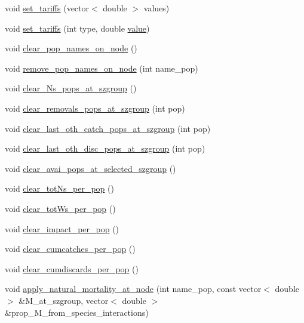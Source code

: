 \begin{DoxyCompactItemize}
\item 
void \mbox{\hyperlink{class_node_a81658faf33c82f61e6e774c89c6e3b27}{set\+\_\+tariffs}} (vector$<$ double $>$ values)
\item 
void \mbox{\hyperlink{class_node_a2add3cfb0482a85187c81c709e83a30f}{set\+\_\+tariffs}} (int type, double \mbox{\hyperlink{diffusion_8cpp_a4b41795815d9f3d03abfc739e666d5da}{value}})
\item 
void \mbox{\hyperlink{class_node_aeca936c7fb12f21f0be1c690ceee6e99}{clear\+\_\+pop\+\_\+names\+\_\+on\+\_\+node}} ()
\item 
void \mbox{\hyperlink{class_node_aff336c3c235a39299c807ff9dacd3852}{remove\+\_\+pop\+\_\+names\+\_\+on\+\_\+node}} (int name\+\_\+pop)
\item 
void \mbox{\hyperlink{class_node_ae16a529dbbfd29982b6f4c57d50c5836}{clear\+\_\+\+Ns\+\_\+pops\+\_\+at\+\_\+szgroup}} ()
\item 
void \mbox{\hyperlink{class_node_ac4de3067086399747da37bb4f87459b7}{clear\+\_\+removals\+\_\+pops\+\_\+at\+\_\+szgroup}} (int pop)
\item 
void \mbox{\hyperlink{class_node_a2a6d73539ecc797ccc79e9b21a9fa7aa}{clear\+\_\+last\+\_\+oth\+\_\+catch\+\_\+pops\+\_\+at\+\_\+szgroup}} (int pop)
\item 
void \mbox{\hyperlink{class_node_ae483cf5af866e2fc9764e7532cfc0317}{clear\+\_\+last\+\_\+oth\+\_\+disc\+\_\+pops\+\_\+at\+\_\+szgroup}} (int pop)
\item 
void \mbox{\hyperlink{class_node_a96b30928294d549d4b03d278d2e0aa85}{clear\+\_\+avai\+\_\+pops\+\_\+at\+\_\+selected\+\_\+szgroup}} ()
\item 
void \mbox{\hyperlink{class_node_a2a2ec467d1c6ee5d348afb54b551dae2}{clear\+\_\+tot\+Ns\+\_\+per\+\_\+pop}} ()
\item 
void \mbox{\hyperlink{class_node_a9f3efe5b32c410e8f931254646a53db8}{clear\+\_\+tot\+Ws\+\_\+per\+\_\+pop}} ()
\item 
void \mbox{\hyperlink{class_node_a9cac20f3fbe319dc3afb3eedc492c5b6}{clear\+\_\+impact\+\_\+per\+\_\+pop}} ()
\item 
void \mbox{\hyperlink{class_node_a707223773bbc350011bdbee2d7b21557}{clear\+\_\+cumcatches\+\_\+per\+\_\+pop}} ()
\item 
void \mbox{\hyperlink{class_node_aaccff78e523be3df858cd42fabfb4cd5}{clear\+\_\+cumdiscards\+\_\+per\+\_\+pop}} ()
\item 
void \mbox{\hyperlink{class_node_a566cc4cc020a4877e908076515e7090b}{apply\+\_\+natural\+\_\+mortality\+\_\+at\+\_\+node}} (int name\+\_\+pop, const vector$<$ double $>$ \&M\+\_\+at\+\_\+szgroup, vector$<$ double $>$ \&prop\+\_\+\+M\+\_\+from\+\_\+species\+\_\+interactions)

\end{DoxyCompactItemize}
